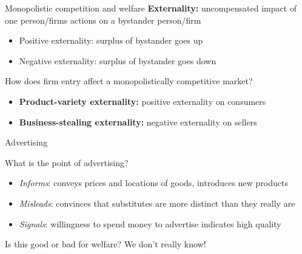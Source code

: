 \documentclass[compress]{beamer}
\begin{document}
\begin{frame}{Monopolistic competition and welfare}
\textbf{Externality:} uncompensated impact of one person/firms actions on a bystander person/firm
\begin{itemize}
    \item Positive externality: surplus of bystander goes up
    \item Negative externality: surplus of bystander goes down
\end{itemize}

\begin{block}{How does firm entry affect a monopolistically competitive market?}
    \begin{itemize}
    \item \textbf{Product-variety externality:} positive externality on consumers
    \item \textbf{Business-stealing externality:} negative externality on sellers
    \end{itemize}
\end{block}
\end{frame}

\begin{frame}{Advertising}
    \begin{block}{What is the point of advertising?}
        \begin{itemize}
            \item \textit{Informs}: conveys prices and locations of goods, introduces new products
            \item \textit{Misleads}: convinces that substitutes are more distinct than they really are
            \item \textit{Signals}: willingness to spend money to advertise indicates high quality
        \end{itemize}
    \end{block}
    \vspace{4mm}

    Is this good or bad for welfare?
    \quad We don't really know!
\end{frame}
\end{document}
